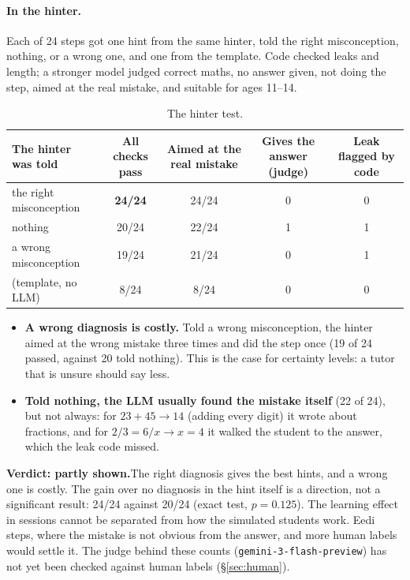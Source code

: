 \documentclass[11pt,a4paper]{article}
\newcommand{\code}[1]{\texttt{#1}}
\newcommand{\best}[1]{\textbf{#1}}
\begin{document}
\paragraph{In the hinter.} Each of 24 steps got one hint from the same hinter, told the right misconception, nothing, or a wrong one, and one from the template. Code checked leaks and length; a stronger model judged correct maths, no answer given, not doing the step, aimed at the real mistake, and suitable for ages 11--14.
\begin{table}[!htbp]
\centering\small
\begin{tabularx}{\linewidth}{@{}P{4.3cm}CCCC@{}}
\toprule
The hinter was told & All checks pass & Aimed at the real mistake & Gives the answer (judge) & Leak flagged by code \\
\midrule
{}the right misconception & \best{24/24} & 24/24 & 0 & 0 \\
nothing & 20/24 & 22/24 & 1 & 1 \\
a wrong misconception & 19/24 & 21/24 & 0 & 1 \\
(template, no LLM) & 8/24 & 8/24 & 0 & 0 \\
\bottomrule
\end{tabularx}
\caption{The hinter test.}
\label{tab:hinter}
\end{table}

\begin{itemize}
  \item \textbf{A wrong diagnosis is costly.} Told a wrong misconception, the hinter aimed at the wrong mistake three times and did the step once (19 of 24 passed, against 20 told nothing). This is the case for certainty levels: a tutor that is unsure should say less.
  \item \textbf{Told nothing, the LLM usually found the mistake itself} (22 of 24), but not always: for $23 + 45 \to 14$ (adding every digit) it wrote about fractions, and for $2/3 = 6/x \to x = 4$ it walked the student to the answer, which the leak code missed.
\end{itemize}

\begin{verdict}
{\sffamily\bfseries\color{primary}Verdict: partly shown.}\enspace The right diagnosis gives the best hints, and a wrong one is costly. The gain over no diagnosis in the hint itself is a direction, not a significant result: 24/24 against 20/24 (exact test, $p = 0.125$). The learning effect in sessions cannot be separated from how the simulated students work. Eedi steps, where the mistake is not obvious from the answer, and more human labels would settle it. The judge behind these counts (\code{gemini-3-flash-preview}) has not yet been checked against human labels (\S\ref{sec:human}).
\end{verdict}
\end{document}
